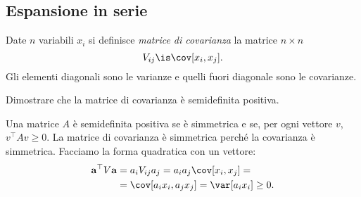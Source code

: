 
\subsection{Espansione in serie}

\begin{definition}
	Date $n$ variabili $x_i$ si definisce \emph{matrice di covarianza} la matrice $n\times n$
	\begin{equation*}
		V_{ij} \is \cov[x_i,x_j].
	\end{equation*}
	Gli elementi diagonali sono le varianze e quelli fuori diagonale sono le covarianze.
\end{definition}

\begin{exercise}
    Dimostrare che la matrice di covarianza è semidefinita positiva.
\end{exercise}

\begin{solution}
    Una matrice $A$ è semidefinita positiva se è simmetrica e se, per ogni
    vettore $v$, $v^\top Av \ge 0$.
    La matrice di covarianza è simmetrica perché la covarianza è simmetrica.
    Facciamo la forma quadratica con un vettore:
    \begin{align*}
        \mathbf a^\top V \mathbf a
        &= a_i V_{ij} a_j
        = a_i a_j \cov[x_i, x_j] = \\
        &= \cov[a_i x_i, a_j x_j]
        = \var[a_i x_i] \ge 0.
    \end{align*}
\end{solution}

